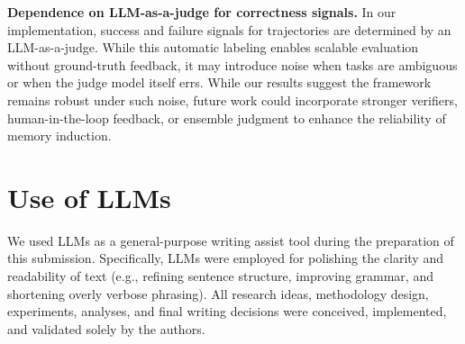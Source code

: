 \noindent\textbf{Dependence on LLM-as-a-judge for correctness signals.} In our implementation, success and failure signals for trajectories are determined by an LLM-as-a-judge. While this automatic labeling enables scalable evaluation without ground-truth feedback, it may introduce noise when tasks are ambiguous or when the judge model itself errs. While our results suggest the framework remains robust under such noise, future work could incorporate stronger verifiers, human-in-the-loop feedback, or ensemble judgment to enhance the reliability of memory induction.

\section{Use of LLMs}
We used LLMs as a general-purpose writing assist tool during the preparation of this submission. Specifically, LLMs were employed for polishing the clarity and readability of text (e.g., refining sentence structure, improving grammar, and shortening overly verbose phrasing). All research ideas, methodology design, experiments, analyses, and final writing decisions were conceived, implemented, and validated solely by the authors.